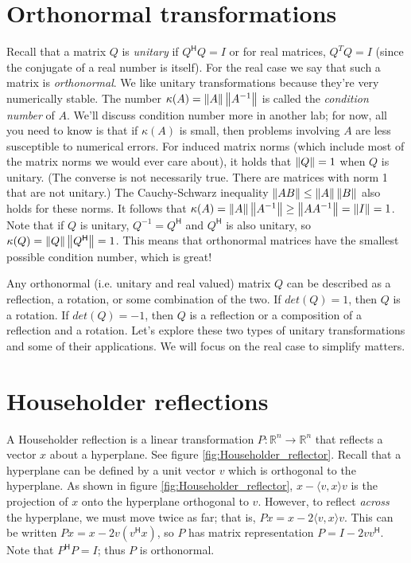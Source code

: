 \label{lab:Canonical Transformations}

\section*{Orthonormal transformations}
Recall that a matrix $Q$ is \emph{unitary} if $Q^\mathsf{H} Q = I$ or for real matrices, 
$Q^T Q = I$ (since the conjugate of a real number is itself).
For the real case we say that such a matrix is \emph{orthonormal}.
We like unitary transformations because they're very numerically stable.
The number $\kappa(A) = \left\lVert A\right\rVert \left\lVert A^{-1}\right\rVert$ is called the \emph{condition number} of $A$.
We'll discuss condition number more in another lab; for now, all you need to know is that if $\kappa(A)$ is small, then problems involving $A$ are less susceptible to numerical errors.
For induced matrix norms (which include most of the matrix norms we would ever care about), it holds that $\left\lVert Q\right\rVert=1$ when $Q$ is unitary.
(The converse is not necessarily true.
There are matrices with norm 1 that are not unitary.)
The Cauchy-Schwarz inequality $\left\lVert AB\right\rVert \leq \left\lVert A\right\rVert \left\lVert B\right\rVert$ also holds for these norms.
It follows that $\kappa(A) = \left\lVert A\right\rVert \left\lVert A^{-1}\right\rVert \geq \left\lVert A A^{-1}\right\rVert = \left\lVert I\right\rVert = 1$.
Note that if $Q$ is unitary, $Q^{-1} = Q^\mathsf{H}$ and $Q^\mathsf{H}$ is also unitary, so $\kappa(Q) = \left\lVert Q\right\rVert \left\lVert Q^\mathsf{H}\right\rVert = 1$.
This means that orthonormal matrices have the smallest possible condition number, which is great!

Any orthonormal (i.e. unitary and real valued) matrix $Q$ can be described as a reflection, a rotation, or some combination of the two.
If $det(Q) = 1$, then $Q$ is a rotation.
If $det(Q) = -1$, then $Q$  is a reflection or a composition of a reflection and a rotation.
Let's explore these two types of unitary transformations and some of their applications.
We will focus on the real case to simplify matters.

\section*{Householder reflections}
A Householder reflection is a linear transformation $P: \mathbb{R}^n \rightarrow \mathbb{R}^n$ that reflects a vector $x$ about a hyperplane.
See figure \ref{fig:Householder_reflector}.
Recall that a hyperplane can be defined by a unit vector $v$ which is orthogonal to the hyperplane.
As shown in figure \ref{fig:Householder_reflector}, $x - \langle v,x \rangle v$ is the projection of $x$ onto the hyperplane orthogonal to $v$.
However, to reflect \emph{across} the hyperplane, we must move twice as far; that is, $Px = x - 2\langle v,x \rangle v$.
This can be written $Px = x - 2v(v^\mathsf{H} x)$, so $P$ has matrix representation $P = I - 2v v^\mathsf{H}$.
Note that $P^\mathsf{H} P = I$; thus $P$ is orthonormal.

